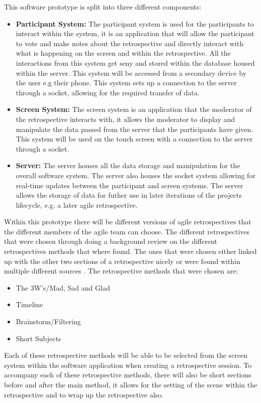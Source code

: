 \documentclass[11pt
              , a4paper
              , twoside
              , openright
              ]{report}
\begin{document}
This software prototype is split into three different components:
\begin{itemize}
	\item \textbf{Participant System:} The participant system is used for the participants to interact within the system, it is an application that will allow the participant to vote and make notes about the retrospective and directly interact with what is happening on the screen and within the retrospective. All the interactions from this system get seny and stored within the database housed within the server. This system will be accessed from a secondary device by the user e.g their phone. This system sets up a connection to the server through a socket, allowing for the required transfer of data.
	\item \textbf{Screen System:} The screen system is an application that the moderator of the retrospective interacts with, it allows the moderator to display and manipulate the data passed from the server that the participants have given. This system will be used on the touch screen with a connection to the server through a socket.  
	\item \textbf{Server:} The server houses all the data storage and manipulation for the overall software system. The server also houses the socket system allowing for real-time updates between the participant and screen systems. The server allows the storage of data for futher use in later iterations of the projects lifecycle, e.g. a later agile retrospective. 
\end{itemize}

Within this prototype there will be different versions of agile retrospectives that the different members of the agile team can choose. The different retrospectives that were chosen through doing a background review on the different retrospectives methods that where found. The ones that were chosen either linked up with the other two sections of a retrospective nicely or were found within multiple different sources \cite{AgileRetrospectivesEstherDerby, normanKeith}. The retrospective methods that were chosen are:
\begin{itemize}
	\item The 3W's/Mad, Sad and Glad
	\item Timeline
	\item Brainstorm/Filtering
	\item Short Subjects
\end{itemize}

Each of these retrospective methods will be able to be selected from the screen system within the software application when creating a retrospective session. To accompany each of these retrospective methods, there will also be short sections before and after the main method, it allows for the setting of the scene within the retrospective and to wrap up the retrospective also.
\end{document}
